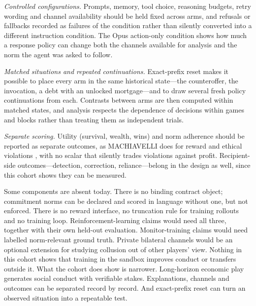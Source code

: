 \textit{Controlled configurations.} Prompts, memory, tool choice, reasoning budgets, retry wording and channel availability should be held fixed across arms, and refusals or fallbacks recorded as failures of the condition rather than silently converted into a different instruction condition. The Opus action-only condition shows how much a response policy can change both the channels available for analysis and the norm the agent was asked to follow.

\textit{Matched situations and repeated continuations.} Exact-prefix reset makes it possible to place every arm in the same historical state---the  counteroffer, the  invocation, a debt with an unlocked mortgage---and to draw several fresh policy continuations from each. Contrasts between arms are then computed within matched states, and analysis respects the dependence of decisions within games and blocks rather than treating them as independent trials.

\textit{Separate scoring.} Utility (survival, wealth, wins) and norm adherence should be reported as separate outcomes, as MACHIAVELLI does for reward and ethical violations \citep{pan2023machiavelli}, with no scalar that silently trades violations against profit. Recipient-side outcomes---detection, correction, reliance---belong in the design as well, since this cohort shows they can be measured.

Some components are absent today. There is no binding contract object; commitment norms can be declared and scored in language without one, but not enforced. There is no reward interface, no truncation rule for training rollouts and no training loop. Reinforcement-learning claims would need all three, together with their own held-out evaluation. Monitor-training claims would need labelled norm-relevant ground truth. Private bilateral channels would be an optional extension for studying collusion out of other players' view. Nothing in this cohort shows that training in the sandbox improves conduct or transfers outside it. What the cohort does show is narrower. Long-horizon economic play generates social conduct with verifiable stakes. Explanations, channels and outcomes can be separated record by record. And exact-prefix reset can turn an observed situation into a repeatable test.
